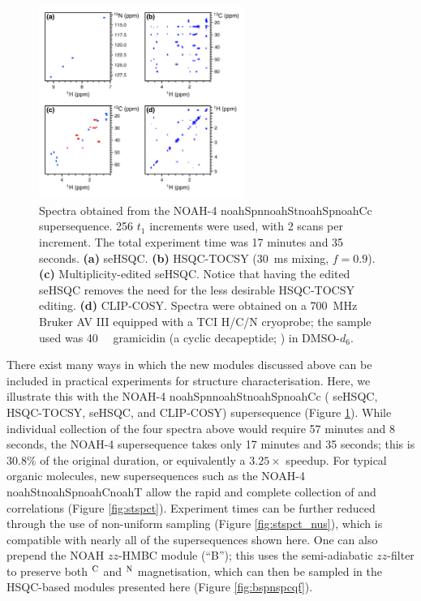 \documentclass[11pt]{article}
\newcommand*{\noahfour}[4]{\csname noah#1\endcsname\csname noah#2\endcsname\csname noah#3\endcsname\csname noah#4\endcsname}
\newcommand*{\noahB}{B}
\newcommand*{\carbon}{\ce{^{13}C}}
\newcommand*{\nitrogen}{\ce{^{15}N}}
\newcommand*{\magn}[1]{\ce{^1H}$^{#1}$}
\newcommand*{\figref}[1]{Figure \ref{fig:#1}}
\begin{document}


\begin{figure}
    \centering
    \includegraphics[width=0.6\textwidth]{spstspcc.png}
    \caption{
        Spectra obtained from the NOAH-4 \noahfour{Spn}{St}{Sp}{Cc} supersequence.
        256 $t_1$ increments were used, with 2 scans per increment.
        The total experiment time was 17 minutes and 35 seconds.
        \textbf{(a)} \nitrogen{} seHSQC.
        \textbf{(b)} \carbon{} HSQC-TOCSY (\SI{30}{ms} mixing, $f = 0.9$).
        \textbf{(c)} Multiplicity-edited \carbon{} seHSQC. Notice that having the edited seHSQC removes the need for the less desirable HSQC-TOCSY editing.
        \textbf{(d)} CLIP-COSY.
        Spectra were obtained on a \SI{700}{\MHz} Bruker AV III equipped with a TCI H/C/N cryoprobe; the sample used was \SI{40}{\milli\molar} gramicidin (a cyclic decapeptide; ) in DMSO-$d_6$.
    }
    \label{fig:example_spec}
\end{figure}

There exist many ways in which the new modules discussed above can be included in practical experiments for structure characterisation.
Here, we illustrate this with the NOAH-4 \noahfour{Spn}{St}{Sp}{Cc} (\nitrogen{} seHSQC, \carbon{} HSQC-TOCSY, \carbon{} seHSQC, and CLIP-COSY) supersequence (\figref{example_spec}).
While individual collection of the four spectra above would require 57 minutes and 8 seconds, the NOAH-4 supersequence takes only 17 minutes and 35 seconds; this is $30.8\%$ of the original duration, or equivalently a $3.25\times$ speedup.
For typical organic molecules, new supersequences such as the NOAH-4 \noahfour{St}{Sp}{C}{T} allow the rapid and complete collection of  and  correlations (\figref{stspct}).
Experiment times can be further reduced through the use of non-uniform sampling (\figref{stspct_nus}), which is compatible with nearly all of the supersequences shown here.
One can also prepend the NOAH $zz$-HMBC module (``\noahB{}'');\autocite{Kupce2019JMR} this uses the semi-adiabatic $zz$-filter to preserve both \magn{\ce{C}} and \magn{\ce{N}} magnetisation, which can then be sampled in the HSQC-based modules presented here (\figref{bspnspcqf}).
\end{document}
